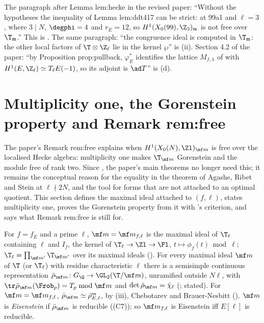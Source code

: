 \begin{paperlink}\label{pl:moddeg:lem-hecke}
The paragraph after Lemma lem:hecke in the revised paper: ``Without the hypotheses the inequality of Lemma lem:ddt417 can be strict: at 99a1 and $\ell=3$, where $3\mid N$,
$\degphi=4$ and $r_E=12$, so $H^1(X_0(99),\Z_3)_{\mathfrak m}$ is not free over $\T_{\mathfrak m}$.'' This is . The same paragraph: ``the congruence ideal is computed in
$\T_{\mathfrak m}$: the other local factors of $\T\otimes\Z_\ell$ lie in the kernel $\wp$'' is (ii). Section 4.2 of the paper: ``by Proposition prop:pullback,
$\varphi_E^*$ identifies the lattice $M_{f,\lambda}$ of \cite{DFG04} with $H^1(E,\Z_\ell)\simeq T_\ell E(-1)$, so its adjoint is $\ad T$'' is (d).
\end{paperlink}

\section[Multiplicity one and the Gorenstein property]{Multiplicity one, the Gorenstein property and Remark rem:free}\label{sec:moddeg:mult-one}

The paper's Remark rem:free explains when $H^1(X_0(N),\Zl)_{\mf m}$ is free over the localised Hecke algebra: multiplicity one makes $\T_{\mf m}$ Gorenstein and the module free of rank two. Since
, the paper's main theorems no longer need this; it remains the conceptual reason for the equality in the theorem of Agashe, Ribet and Stein at $\ell\nmid2N$, and the
tool for forms that are not attached to an optimal quotient. This section defines the maximal ideal attached to $(f,\ell)$, states multiplicity one, proves the Gorenstein property from it
with 's criterion, and says what Remark rem:free is still for.

\begin{definition}\label{def:moddeg:maximal-ideal}
For $f=f_E$ and a prime $\ell$, $\mf m=\mf m_{f,\ell}$ is the maximal ideal of $\T_\ell$ containing $\ell$ and $I_f$, the kernel of $\T_\ell\to\Zl\to\Fl$, $t\mapsto\phi_f(t)\bmod\ell$; $\T_\ell=\prod_{\mf m'}\T_{\mf m'}$ over
its maximal ideals (). For every maximal ideal $\mf m$ of $\T$ (or $\T_\ell$) with residue characteristic $\ell$ there is a semisimple continuous representation
$\bar\rho_{\mf m}\colon G_\Q\to\GL_2(\T/\mf m)$, unramified outside $N\ell$, with $\tr\bar\rho_{\mf m}(\Frob_p)=T_p\bmod\mf m$ and $\det\bar\rho_{\mf m}=\bar\chi_\ell$ (; stated). For
$\mf m=\mf m_{f,\ell}$, $\bar\rho_{\mf m}\simeq\bar\rho_{E,\ell}^{\mathrm{ss}}$, by (iii), Chebotarev and Brauer-Nesbitt (). $\mf m$ is
\emph{Eisenstein} if $\bar\rho_{\mf m}$ is reducible ((C7)); so $\mf m_{f,\ell}$ is Eisenstein iff $E[\ell]$ is reducible.
\end{definition}

